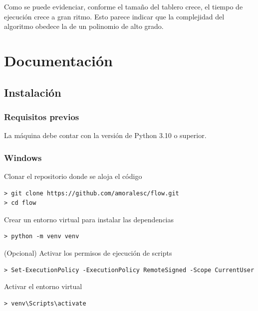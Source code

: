 \documentclass[letter,12pt]{article}
\begin{document}
Como se puede evidenciar, conforme el tamaño del tablero crece, el tiempo de ejecución crece a gran ritmo. Esto parece indicar que la complejidad del algoritmo obedece la de un polinomio de alto grado. \par

\newpage



\section{Documentación} \label{documentacion}

\subsection{Instalación} \label{documentacion:instalacion}

\subsubsection{Requisitos previos} \label{documentacion:instalacion:requisitos}

La máquina debe contar con la versión de Python 3.10 o superior.

\subsubsection{Windows} \label{documentacion:instalacion:windows}

Clonar el repositorio donde se aloja el código

\begin{verbatim}
> git clone https://github.com/amoralesc/flow.git
> cd flow
\end{verbatim}

Crear un entorno virtual para instalar las dependencias

\begin{verbatim}
> python -m venv venv
\end{verbatim}

(Opcional) Activar los permisos de ejecución de scripts

\begin{verbatim}
> Set-ExecutionPolicy -ExecutionPolicy RemoteSigned -Scope CurrentUser
\end{verbatim}

Activar el entorno virtual

\begin{verbatim}
> venv\Scripts\activate
\end{verbatim}
\end{document}
